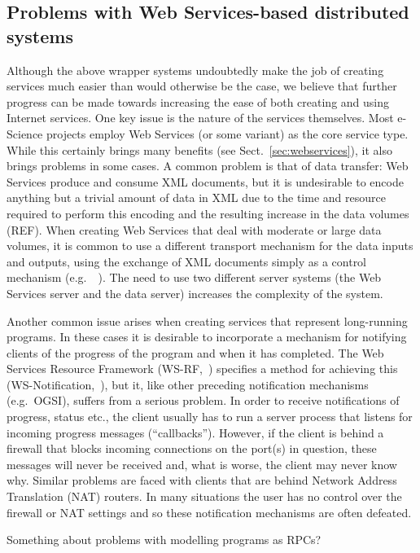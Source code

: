 \documentclass{llncs}
\begin{document}
\subsection{Problems with Web Services-based distributed systems}\label{sec:wsproblems}
Although the above wrapper systems undoubtedly make the job of creating services much easier than would otherwise be the case, we believe that further progress can be made towards increasing the ease of both creating and using Internet services.  One key issue is the nature of the services themselves.  Most e-Science projects employ Web Services (or some variant) as the core service type.  While this certainly brings many benefits (see Sect.~\ref{sec:webservices}), it also brings problems in some cases.  A common problem is that of data transfer: Web Services produce and consume XML documents, but it is undesirable to encode anything but a trivial amount of data in XML due to the time and resource required to perform this encoding and the resulting increase in the data volumes (REF).  When creating Web Services that deal with moderate or large data volumes, it is common to use a different transport mechanism for the data inputs and outputs, using the exchange of XML documents simply as a control mechanism (e.g.\ ~\cite{Woolf:2003,blower:2005}).  The need to use two different server systems (the Web Services server and the data server) increases the complexity of the system.

Another common issue arises when creating services that represent long-running programs.  In these cases it is desirable to incorporate a mechanism for notifying clients of the progress of the program and when it has completed.  The Web Services Resource Framework (WS-RF,~\cite{wsrf}) specifies a method for achieving this (WS-Notification,~\cite{wsrf-notification}), but it, like other preceding notification mechanisms (e.g.\ OGSI), suffers from a serious problem.  In order to receive notifications of progress, status etc., the client usually has to run a server process that listens for incoming progress messages (``callbacks'').  However, if the client is behind a firewall that blocks incoming connections on the port(s) in question, these messages will never be received and, what is worse, the client may never know why.  Similar problems are faced with clients that are behind Network Address Translation (NAT) routers.  In many situations the user has no control over the firewall or NAT settings and so these notification mechanisms are often defeated.

Something about problems with modelling programs as RPCs?
\end{document}
